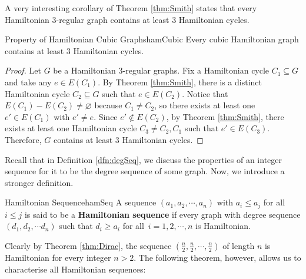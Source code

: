 \documentclass[math]{amznotes}
\theoremstyle{remark}
\newcommand{\0}{\mathbf{0}}
\newcommand{\1}{\mathbf{1}}
\begin{document}
A very interesting corollary of Theorem \ref{thm:Smith} states that every Hamiltonian $3$-regular graph contains at least $3$ Hamiltonian cycles.
\begin{corbox}{Property of Hamiltonian Cubic Graphs}{hamCubic}
    Every cubic Hamiltonian graph contains at least $3$ Hamiltonian cycles.
    \tcblower
    \begin{proof}
        Let $G$ be a Hamiltonian $3$-regular graphs. Fix a Hamiltonian cycle $C_1 \subseteq G$ and take any $e \in E(C_1)$. By Theorem \ref{thm:Smith}, there is a distinct Hamiltonian cycle $C_2 \subseteq G$ such that $e \in E(C_2)$. Notice that $E(C_1) - E(C_2) \neq \varnothing$ because $C_1 \neq C_2$, so there exists at least one $e' \in E(C_1)$ with $e' \neq e$. Since $e' \notin E(C_2)$, by Theorem \ref{thm:Smith}, there exists at least one Hamiltonian cycle $C_3 \neq C_2, C_1$ such that $e' \in E(C_3)$. Therefore, $G$ contains at least $3$ Hamiltonian cycles.
    \end{proof}
\end{corbox}
Recall that in Definition \ref{dfn:degSeq}, we discuss the properties of an integer sequence for it to be the degree sequence of some graph. Now, we introduce a stronger definition.
\begin{dfnbox}{Hamiltonian Sequence}{hamSeq}
    A sequence $(a_1, a_2, \cdots, a_n)$ with $a_i \leq a_j$ for all $i \leq j$ is said to be a {\color{red} \textbf{Hamiltonian sequence}} if every graph with degree sequence $(d_1, d_2, \cdots d_n)$ such that $d_i \geq a_i$ for all~$i = 1, 2, \cdots, n$ is Hamiltonian.
\end{dfnbox}
Clearly by Theorem \ref{thm:Dirac}, the sequence $\left(\frac{n}{2}, \frac{n}{2}, \cdots, \frac{n}{2}\right)$ of length $n$ is Hamiltonian for every integer $n > 2$. The following theorem, however, allows us to characterise all Hamiltonian sequences:
\end{document}
